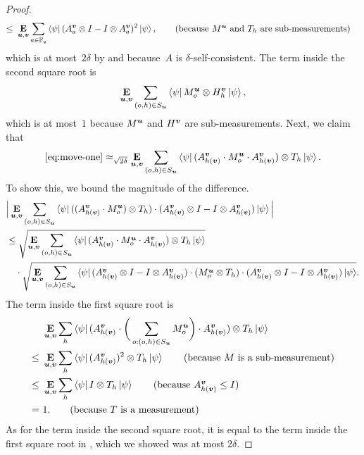 \begin{proof}
\begin{align*}
\leq~&\E_{\bu, \bv} \sum_{a \in \F_q} \bra{\psi} (A^{\bv}_a \otimes I - I \otimes A^{\bv}_a)^2 \ket{\psi}, \tag{because $M^{\bu}$ and $T_h$ are sub-measurements}
\end{align*}
which is at most~$2\delta$ by  and because~$A$ is $\delta$-self-consistent.
The term inside the second square root is
\begin{equation*}
\mathop{\bf E\/}_{\boldsymbol{u}, \boldsymbol{v}} \sum_{(o, h) \in S_{\boldsymbol{u}}} \bra{\psi}  M^{\boldsymbol{u}}_o \otimes H^{\boldsymbol{v}}_h \ket{\psi},
\end{equation*}
which is at most~$1$ because $M^{\boldsymbol{u}}$ and $H^{\boldsymbol{v}}$ are sub-measurements.
Next, we claim that
\begin{equation}\label{eq:move-another}
\eqref{eq:move-one}
\approx_{\sqrt{2\delta}}
\mathop{\bf E\/}_{\boldsymbol{u}, \boldsymbol{v}} \sum_{(o, h) \in S_{\boldsymbol{u}}} \bra{\psi} (A^{\boldsymbol{v}}_{h(\boldsymbol{v})} \cdot M^{\boldsymbol{u}}_o \cdot A^{\boldsymbol{v}}_{h(\boldsymbol{v})}) \otimes T_h  \ket{\psi}.
\end{equation}
To show this, we bound the magnitude of the difference.
\begin{align}\label{eq:move-another-cauchy-schwarz}
&\Big|\mathop{\bf E\/}_{\boldsymbol{u}, \boldsymbol{v}} \sum_{(o, h) \in S_{\boldsymbol{u}}} \bra{\psi} ((A^{\boldsymbol{v}}_{h(\boldsymbol{v})} \cdot M^{\boldsymbol{u}}_o) \otimes T_h) \cdot (A^{\boldsymbol{v}}_{h(\boldsymbol{v})} \otimes I - I \otimes A^{\boldsymbol{v}}_{h(\boldsymbol{v})})  \ket{\psi}\Big|\nonumber\\
&\leq\sqrt{\mathop{\bf E\/}_{\boldsymbol{u}, \boldsymbol{v}} \sum_{(o, h) \in S_{\boldsymbol{u}}} \bra{\psi} (A^{\boldsymbol{v}}_{h(\boldsymbol{v})} \cdot M^{\boldsymbol{u}}_o \cdot A^{\boldsymbol{v}}_{h(\boldsymbol{v})}) \otimes T_h  \ket{\psi}}\nonumber\\
&\quad\cdot \sqrt{\mathop{\bf E\/}_{\boldsymbol{u}, \boldsymbol{v}} \sum_{(o, h) \in S_{\boldsymbol{u}}} \bra{\psi} (A^{\boldsymbol{v}}_{h(\boldsymbol{v})} \otimes I - I \otimes A^{\boldsymbol{v}}_{h(\boldsymbol{v})}) \cdot (M^{\boldsymbol{u}}_o \otimes T_h) \cdot (A^{\boldsymbol{v}}_{h(\boldsymbol{v})} \otimes I - I \otimes A^{\boldsymbol{v}}_{h(\boldsymbol{v})}) \ket{\psi}}.
\end{align}
The term inside the first square root is
\begin{align*}
&\E_{\bu, \bv} \sum_h \bra{\psi} (A^{\bv}_{h(\bv)} \cdot \bigg(\sum_{o:(o, h) \in S_{\bu}} M^{\bu}_o \bigg)\cdot A^{\bv}_{h(\bv)}) \otimes T_h  \ket{\psi}\\
\leq~&\E_{\bu, \bv} \sum_h \bra{\psi} (A^{\bv}_{h(\bv)})^2 \otimes T_h  \ket{\psi}\tag{because~$M$ is a sub-measurement}\\
\leq~&\E_{\bu, \bv} \sum_h \bra{\psi} I \otimes T_h  \ket{\psi}\tag{because~$A^{\bv}_{h(\bv)} \leq I$}\\
=~&1.\tag{because~$T$ is a measurement}
\end{align*}
As for the term inside the second square root, it is equal to the term inside the first square root in , which we showed was at most $2\delta$.


\end{proof}
